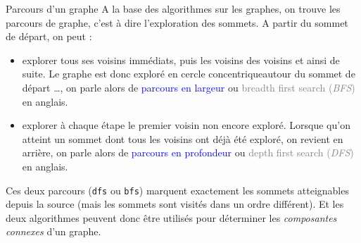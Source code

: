 \documentclass[10pt]{beamer}
\begin{document}
\begin{frame}[fragile]{\Ctitle}{\stitle}
	\begin{block}{Parcours d'un graphe}
		A la base des algorithmes sur les graphes, on trouve les parcours de graphe, c'est à dire l'exploration des sommets. A partir du sommet de départ, on peut :
		\begin{itemize}
			\item<2-> explorer tous ses voisins immédiats, puis les voisins des voisins et ainsi de suite. Le graphe est donc exploré en \og cercle concentrique\fg autour du sommet de départ  \dots, on parle alors de  \textcolor{blue}{parcours en largeur} ou \textcolor{gray}{breadth first search (\textit{BFS})} en anglais.
			\item<3-> explorer à chaque étape le premier voisin non encore exploré. Lorsque qu'on atteint un sommet dont tous les voisins ont déjà été exploré, on revient en arrière, on parle alors de  \textcolor{blue}{parcours en profondeur} ou \textcolor{gray}{depth first search (\textit{DFS})} en anglais.
		\end{itemize}
		Ces deux parcours ({\tt dfs} ou {\tt bfs}) marquent exactement les sommets atteignables depuis la source (mais les sommets sont visités dans un ordre différent). Et les deux algorithmes peuvent donc être utilisés pour déterminer les \textit{composantes connexes} d'un graphe.
	\end{block}
\end{frame}
\end{document}
